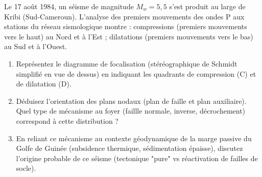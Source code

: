 \documentclass[11pt]{article}
\begin{document}
\begin{exercice}
\noindent Le 17 août 1984, un séisme de magnitude $M_w = 5,5$ s'est produit au large de Kribi (Sud-Cameroun). L'analyse des premiers mouvements des ondes P aux stations du réseau sismologique montre : compressions (premiers mouvements vers le haut) au Nord et à l'Est ; dilatations (premiers mouvements vers le bas) au Sud et à l'Ouest.

\begin{enumerate}
    \item Représentez le diagramme de focalisation (stéréographique de Schmidt simplifié en vue de dessus) en indiquant les quadrants de compression (C) et de dilatation (D). 
    \item Déduisez l'orientation des plans nodaux (plan de faille et plan auxiliaire). Quel type de mécanisme au foyer (faillle normale, inverse, décrochement) correspond à cette distribution ?
    \item En reliant ce mécanisme au contexte géodynamique de la marge passive du Golfe de Guinée (subsidence thermique, sédimentation épaisse), discutez l'origine probable de ce séisme (tectonique "pure" vs réactivation de failles de socle).
\end{enumerate}
\end{exercice}
\end{document}
